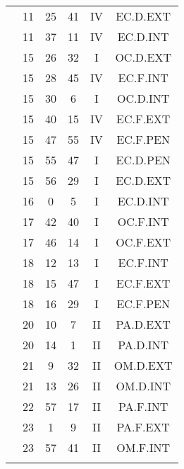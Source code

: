 \documentclass[12pt, a4paper]{article}
\begin{document}
\begin{multicols}{3}
{\begin{tabular}{c c c c c c}
	 	 	 	 & 11 & 25 & 41 & IV & EC.D.EXT\\%
	 	 	 	 & 11 & 37 & 11 & IV & EC.D.INT\\%
	 	 	 	 & 15 & 26 & 32 & I & OC.D.EXT\\%
	 	 	 	 & 15 & 28 & 45 & IV & EC.F.INT\\%
	 	 	 	 & 15 & 30 & 6 & I & OC.D.INT\\%
	 	 	 	 & 15 & 40 & 15 & IV & EC.F.EXT\\%
	 	 	 	 & 15 & 47 & 55 & IV & EC.F.PEN\\%
	 	 	 	 & 15 & 55 & 47 & I & EC.D.PEN\\%
	 	 	 	 & 15 & 56 & 29 & I & EC.D.EXT\\%
	 	 	 	 & 16 & 0 & 5 & I & EC.D.INT\\%
	 	 	 	 & 17 & 42 & 40 & I & OC.F.INT\\%
	 	 	 	 & 17 & 46 & 14 & I & OC.F.EXT\\%
	 	 	 	 & 18 & 12 & 13 & I & EC.F.INT\\%
	 	 	 	 & 18 & 15 & 47 & I & EC.F.EXT\\%
	 	 	 	 & 18 & 16 & 29 & I & EC.F.PEN\\%
	 	 	 	 & 20 & 10 & 7 & II & PA.D.EXT\\%
	 	 	 	 & 20 & 14 & 1 & II & PA.D.INT\\%
	 	 	 	 & 21 & 9 & 32 & II & OM.D.EXT\\%
	 	 	 	 & 21 & 13 & 26 & II & OM.D.INT\\%
	 	 	 	 & 22 & 57 & 17 & II & PA.F.INT\\%
	 	 	 	 & 23 & 1 & 9 & II & PA.F.EXT\\%
	 	 	 	 & 23 & 57 & 41 & II & OM.F.INT\\%
	 	 	 	 & & & & & \\%

\end{tabular}}
\end{multicols}
\end{document}
